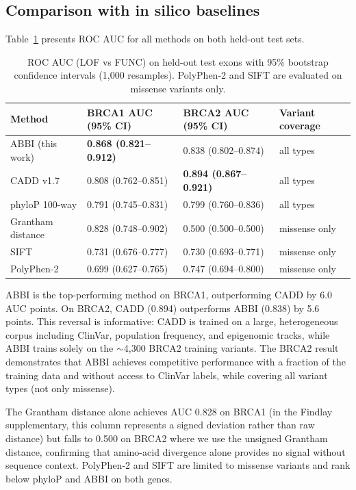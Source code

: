 \documentclass[12pt]{article}
\newcommand{\abbi}{\textsc{ABBI}}
\begin{document}
\subsection{Comparison with in silico baselines}

Table~\ref{tab:baselines} presents ROC AUC for all methods on both held-out test sets.

\begin{table}[ht]
\centering
\caption{ROC AUC (LOF vs FUNC) on held-out test exons with 95\% bootstrap confidence
intervals (1{,}000 resamples). PolyPhen-2 and SIFT are evaluated on missense variants only.}
\label{tab:baselines}
\begin{tabular}{llll}
\toprule
\textbf{Method} & \textbf{BRCA1 AUC (95\% CI)} & \textbf{BRCA2 AUC (95\% CI)} & \textbf{Variant coverage} \\
\midrule
\abbi{} (this work)  & \textbf{0.868 (0.821--0.912)} & 0.838 (0.802--0.874)          & all types \\
CADD v1.7            & 0.808 (0.762--0.851)          & \textbf{0.894 (0.867--0.921)} & all types \\
phyloP 100-way       & 0.791 (0.745--0.831)          & 0.799 (0.760--0.836)          & all types \\
Grantham distance    & 0.828 (0.748--0.902)          & 0.500 (0.500--0.500)          & missense only \\
SIFT                 & 0.731 (0.676--0.777)          & 0.730 (0.693--0.771)          & missense only \\
PolyPhen-2           & 0.699 (0.627--0.765)          & 0.747 (0.694--0.800)          & missense only \\
\bottomrule
\end{tabular}
\end{table}

\abbi{} is the top-performing method on BRCA1, outperforming CADD by 6.0 AUC points.
On BRCA2, CADD (0.894) outperforms \abbi{} (0.838) by 5.6 points.
This reversal is informative: CADD is trained on a large, heterogeneous corpus including
ClinVar, population frequency, and epigenomic tracks, while \abbi{} trains solely on
the $\sim$4{,}300 BRCA2 training variants.
The BRCA2 result demonstrates that \abbi{} achieves competitive performance with a
fraction of the training data and without access to ClinVar labels, while covering
all variant types (not only missense).

The Grantham distance alone achieves AUC 0.828 on BRCA1 (in the Findlay
supplementary, this column represents a signed deviation rather than raw distance) but
falls to 0.500 on BRCA2 where we use the unsigned Grantham distance,
confirming that amino-acid divergence alone provides no signal without sequence context.
PolyPhen-2 and SIFT are limited to missense variants and rank below phyloP and \abbi{}
on both genes.
\end{document}
